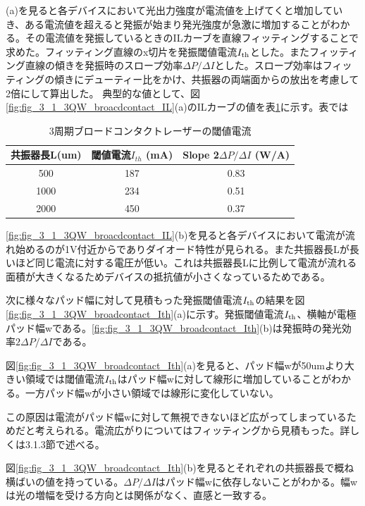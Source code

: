 (a)を見ると各デバイスにおいて光出力強度が電流値を上げてくと増加していき、ある電流値を超えると発振が始まり発光強度が急激に増加することがわかる。その電流値を発振しているときのILカーブを直線フィッティングすることで求めた。フィッティング直線のx切片を発振閾値電流$I_{\rm{th}}$とした。またフィッティング直線の傾きを発振時のスロープ効率$\Delta P/\Delta I$とした。スロープ効率はフィッティングの傾きにデューティー比をかけ、共振器の両端面からの放出を考慮して2倍にして算出した。
典型的な値として、図\ref{fig:fig_3_1_3QW_broacdcontact_IL}(a)のILカーブの値を表\ref{table:table_3_1_3QW_broadcontact}に示す。表では
\begin{table}[h]
  \caption{3周期ブロードコンタクトレーザーの閾値電流}
  \label{table:table_3_1_3QW_broadcontact}
  \centering
  \begin{tabular}{ccc}
    \hline
    共振器長L(um)  & 閾値電流$I_{th}$ (mA)  & Slope 2$\Delta P/\Delta I$ (W/A) \\
    \hline \hline
     500& 187&  0.83  \\
    1000& 234& 0.51\\
    2000& 450&0.37\\
       \hline
  \end{tabular}
\end{table}



\ref{fig:fig_3_1_3QW_broacdcontact_IL}(b)を見ると各デバイスにおいて電流が流れ始めるのが1V付近からでありダイオード特性が見られる。また共振器長Lが長いほど同じ電流に対する電圧が低い。これは共振器長Lに比例して電流が流れる面積が大きくなるためデバイスの抵抗値が小さくなっているためである。


次に様々なパッド幅に対して見積もった発振閾値電流$I_{\rm{th}}$の結果を図\ref{fig:fig_3_1_3QW_broadcontact_Ith}(a)に示す。発振閾値電流$I_{\rm{th}}$、横軸が電極パッド幅wである。\ref{fig:fig_3_1_3QW_broadcontact_Ith}(b)は発振時の発光効率$2 \Delta P/\Delta I$である。

図\ref{fig:fig_3_1_3QW_broadcontact_Ith}(a)を見ると、パッド幅wが50umより大きい領域では閾値電流$I_{\rm{th}}$はパッド幅wに対して線形に増加していることがわかる。一方パッド幅wが小さい領域では線形に変化していない。

この原因は電流がパッド幅wに対して無視できないほど広がってしまっているためだと考えられる。電流広がりについてはフィッティングから見積もった。詳しくは3.1.3節で述べる。

図\ref{fig:fig_3_1_3QW_broadcontact_Ith}(b)を見るとそれぞれの共振器長で概ね横ばいの値を持っている。$\Delta P/\Delta I$はパッド幅wに依存しないことがわかる。幅wは光の増幅を受ける方向とは関係がなく、直感と一致する。

